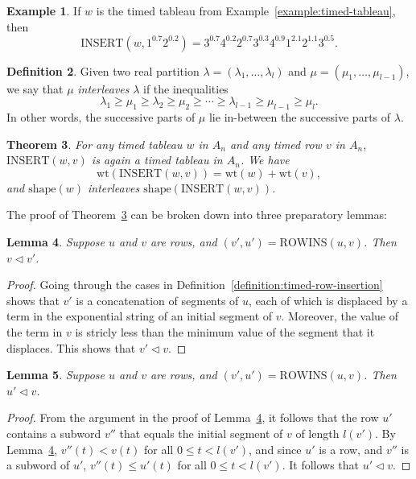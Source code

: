 \documentclass[12pt]{amsart}
\newtheorem{theorem}{Theorem}[subsection]
\newtheorem{lemma}[theorem]{Lemma}
\theoremstyle{definition}
\newtheorem{definition}[theorem]{Definition}
\newtheorem{example}[theorem]{Example}
\newcommand{\rowins}{\mathrm{ROWINS}}
\newcommand{\ins}{\mathrm{INSERT}}
\newcommand{\wt}{\mathrm{wt}}
\newcommand{\shape}{\mathrm{shape}}
\begin{document}
\begin{example}
  If $w$ is the timed tableau from Example~\ref{example:timed-tableau}, then
  \begin{displaymath}
    \ins(w,1^{0.7}2^{0.2})=3^{0.7}4^{0.2}2^{0.7}3^{0.3}4^{0.9}1^{2.1}2^{1.1}3^{0.5}.
  \end{displaymath}
\end{example}
\begin{definition}
  Given two real partition $\lambda=(\lambda_1,\dotsc,\lambda_l)$ and $\mu=(\mu_1,\dotsc,\mu_{l-1})$, we say that $\mu$ \emph{interleaves} $\lambda$ if the inequalities
  \begin{displaymath}
    \lambda_1 \geq \mu_1 \geq \lambda_2 \geq \mu_2 \geq \dotsb \geq \lambda_{l-1}\geq \mu_{l-1}\geq \mu_l. 
  \end{displaymath}
  In other words, the successive parts of $\mu$ lie in-between the successive parts of $\lambda$.
\end{definition}
\begin{theorem}
  \label{theorem:tableauness-of-insertion}
  For any timed tableau $w$ in $A_n$ and any timed row $v$ in $A_n$, $\ins(w,v)$ is again a timed tableau in $A_n$.
  We have
  \begin{displaymath}
    \wt(\ins(w,v)) = \wt(w) + \wt(v),
  \end{displaymath}
  and $\shape(w)$ interleaves $\shape(\ins(w,v))$.
\end{theorem}
The proof of Theorem~\ref{theorem:tableauness-of-insertion} can be broken down into three preparatory lemmas:
\begin{lemma}
  \label{lemma:dom1.5}
  Suppose $u$ and $v$ are rows, and $(v',u')=\rowins(u,v)$.
  Then $v\lhd v'$.
\end{lemma}
\begin{proof}
  Going through the cases in Definition~\ref{definition:timed-row-insertion} shows that $v'$ is a concatenation of segments of $u$, each of which is displaced by a term in the exponential string of an initial segment of $v$.
  Moreover, the value of the term in $v$ is stricly less than the minimum value of the segment that it displaces.
  This shows that $v'\lhd v$.
\end{proof}
\begin{lemma}
  \label{lemma:dom1}
  Suppose $u$ and $v$ are rows, and $(v',u')=\rowins(u,v)$.
  Then $u'\lhd v$.
\end{lemma}
\begin{proof}
  From the argument in the proof of Lemma~\ref{lemma:dom1.5}, it follows that the row $u'$ contains a subword $v''$ that equals the initial segment of $v$ of length $l(v')$.
  By Lemma~\ref{lemma:dom1.5}, $v''(t)<v(t)$ for all $0\leq t<l(v')$, and since $u'$ is a row, and $v''$ is a subword of $u'$, $v''(t)\leq u'(t)$ for all $0\leq t<l(v')$.
  It follows that $u'\lhd v$.
\end{proof}
\end{document}
